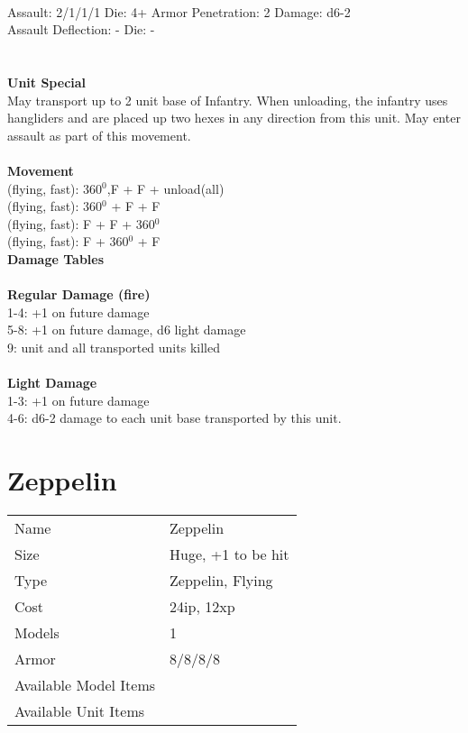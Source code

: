 \ \\
Assault: 2/1/1/1 Die: 4+ Armor Penetration: 2 Damage: d6-2 \\
Assault Deflection: - Die: -\\
\indent  \\
\ \\

{\bf Unit Special} \\
May transport up to 2 unit base of Infantry. When unloading, the infantry uses hangliders and are placed up two hexes in any direction from this unit. May enter assault as part of this movement.
\ \\


\ \\ {\bf Movement } \\
(flying, fast): 360$^0$,F + F + unload(all) \\
(flying, fast): 360$^0$ + F + F \\
(flying, fast): F + F + 360$^0$  \\
(flying, fast): F + 360$^0$ + F \\



{\bf Damage Tables} \\
\ \\ {\bf Regular Damage (fire) } \\
1-4: +1 on future damage \\
5-8: +1 on future damage, d6 light damage \\
9: unit and all transported units killed \\
\ \\ {\bf Light Damage } \\
1-3: +1 on future damage \\
4-6: d6-2 damage to each unit base transported by this unit. \\









\pagebreak

\section{ Zeppelin }

\begin{tabular}{ll}
  Name & Zeppelin \\
  Size & Huge, +1 to be hit\\
  Type & Zeppelin, Flying\\
  Cost & 24ip, 12xp\\
  Models & 1\\
  Armor & 8/8/8/8\\
  Available Model Items &  \\
  Available Unit Items &  \\
\end{tabular}

